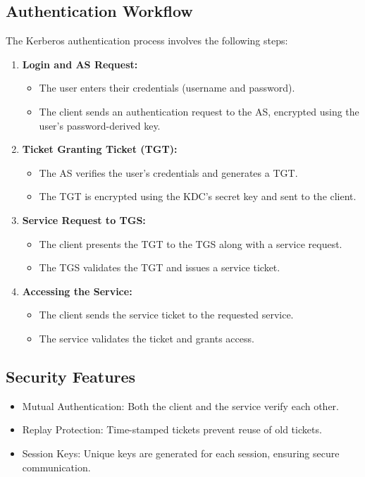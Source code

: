 \documentclass[11pt]{article}
\begin{document}
\subsection{Authentication Workflow}
The Kerberos authentication process involves the following steps:
\begin{enumerate}
\item \textbf{Login and AS Request:}
\begin{itemize}
\item The user enters their credentials (username and password).
\item The client sends an authentication request to the AS, encrypted using the user's password-derived key.
\end{itemize}

\item \textbf{Ticket Granting Ticket (TGT):}
\begin{itemize}
\item The AS verifies the user's credentials and generates a TGT.
\item The TGT is encrypted using the KDC's secret key and sent to the client.
\end{itemize}

\item \textbf{Service Request to TGS:}
\begin{itemize}
\item The client presents the TGT to the TGS along with a service request.
\item The TGS validates the TGT and issues a service ticket.
\end{itemize}

\item \textbf{Accessing the Service:}
\begin{itemize}
\item The client sends the service ticket to the requested service.
\item The service validates the ticket and grants access.
\end{itemize}
\end{enumerate}

\subsection{Security Features}
\begin{itemize}
\item Mutual Authentication: Both the client and the service verify each other.
\item Replay Protection: Time-stamped tickets prevent reuse of old tickets.
\item Session Keys: Unique keys are generated for each session, ensuring secure communication.
\end{itemize}
\end{document}
